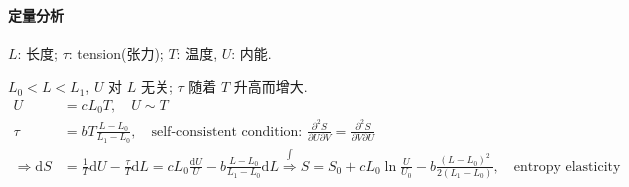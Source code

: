 \documentclass[../../main.tex]{subfiles}
\begin{document}
\paragraph{定量分析}
$L$: 长度; $\tau$: tension(张力); $T$: 温度, $U$: 内能. 

$L_{0}<L<L_{1}$, $U$ 对 $L$ 无关; $\tau$ 随着 $T$ 升高而增大. 
\begin{align*}
    U &= cL_{0}T,\quad U\sim T\\
    \tau &= bT\frac{L-L_{0}}{L_{1}-L_{0}}, \quad \text{self-consistent condition: }\frac{\partial^{2} S}{\partial U\partial V} = \frac{\partial^{2}S}{\partial V\partial U}\\
    \Rightarrow \mathrm{d}S &= \frac{1}{T}\mathrm{d}U - \frac{\tau}{T}\mathrm{d}L = cL_{0}\frac{\mathrm{d}U}{U} - b\frac{L - L_{0}}{L_{1}-L_{0}}\mathrm{d}L
    \stackrel{\int}{\Longrightarrow} S = S_{0} + cL_{0}\ln{\frac{U}{U_{0}}} - b\frac{(L-L_{0})^{2}}{2(L_{1}-L_{0})},\quad \text{entropy elasticity}
\end{align*}
\end{document}
